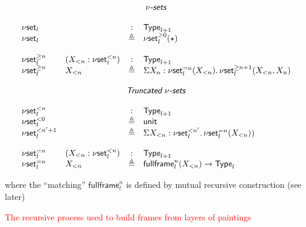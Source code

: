 \documentclass[12pt,landscape]{article}
\newcommand{\sort}[1]{\mathsf{Type}_{#1}}
\newcommand{\defeq}{\triangleq}
\newcommand{\partialcubset}[2]{\mathsf{\nu set}_{#1}^{<#2}}
\newcommand{\mycubset}[1]{\mathsf{\nu set}_{#1}}
\newcommand{\mycubsetfrom}[2]{\mathsf{\nu set}_{#1}^{\geq#2}}
\newcommand{\mycubsetcomp}[2]{\mathsf{\nu set}_{#1}^{=#2}}
\newcommand{\myfullbox}[1]{\mathsf{fullframe}_{#1}}
\newcommand{\unittype}{\mathsf{unit}}
\begin{document}
\begin{Large}
\begin{sf}
$$
\begin{array}{llcl}
\multicolumn{4}{c}{\mbox{\textsf{\textit{$\nu$-sets}}}}\\
\\
\mycubset{l} && : & \sort{l+1}\\
\mycubset{l} && \defeq & \mycubsetfrom{l}{0}(\star)\\
\\
\mycubsetfrom{l}{n} & (X_{<n}:\partialcubset{l}{n}) & : & \sort{l+1}\\
\mycubsetfrom{l}{n} & X_{<n} & \defeq & \Sigma X_n:\mycubsetcomp{l}{n}(X_{<n}).\,\mycubsetfrom{l}{n+1}(X_{<n},X_n)\\
\\
\multicolumn{4}{c}{\mbox{\textsf{\textit{Truncated $\nu$-sets}}}}\\
\\
\partialcubset{l}{n} && : & \sort{l+1}\\
\partialcubset{l}{0} && \defeq & \unittype\\
\partialcubset{l}{n'+1} && \defeq & \Sigma X_{<n}:\partialcubset{l}{n'}.\,\mycubsetcomp{l}{n}(X_{<n}))\\
\\
\mycubsetcomp{l}{n} & (X_{<n}:\partialcubset{l}{n}) & : & \sort{l+1}\\
\mycubsetcomp{l}{n} & X_{<n} & \defeq & \myfullbox{l}^{n}(X_{<n})\rightarrow \sort{l}\\
\end{array}
$$
\bigskip

\noindent where the ``matching'' $\myfullbox{l}^{n}$ is defined by mutual
recursive construction (see later)

\newpage

\begin{center}
\textcolor{red}{\huge The recursive process used to build frames from layers of paintings}
\end{center}

\bigskip
\bigskip


\end{sf}
\end{Large}
\end{document}

